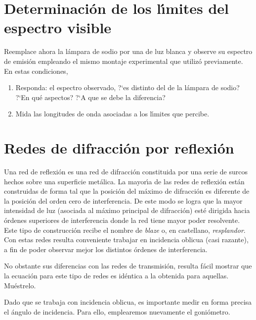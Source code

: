 \documentclass[epj]{svjour}
\begin{document}
\section{Determinaci\'on de los l\'\i mites del espectro visible}

Reemplace ahora la l\'ampara de sodio por una de luz blanca y observe su  
espectro de emisi\'on empleando el mismo montaje experimental que utiliz\'o 
previamente. En estas condiciones, 

\begin{enumerate}
    \item Responda: el espectro observado, ?`es distinto del de la l\'ampara 
        de sodio? ?`En qu\'e aspectos? ?`A que se debe la diferencia? 
    \item Mida las longitudes de onda asociadas a los l\'\i mites que percibe.
\end{enumerate}


\section{Redes de difracci\'on por reflexi\'on}

Una red de reflexi\'on es una red de difracci\'on constituida por una serie
de surcos hechos sobre una superficie met\'alica. La mayor\'\i a de las redes
de reflexi\'on est\'an construidas de forma tal que la posici\'on del m\'aximo
de difracci\'on es diferente de la posici\'on del orden cero de interferencia.
De este modo se logra que la mayor intensidad de luz (asociada al 
m\'aximo principal de difracci\'on) est\'e dirigida hacia \'ordenes superiores
de interferencia donde la red tiene mayor poder resolvente. Este tipo de 
construcci\'on recibe el nombre de {\it blaze} o, en castellano, {\it
resplandor}. Con estas redes resulta conveniente trabajar en incidencia oblicua
(casi razante), a fin de poder observar mejor los distintos \'ordenes de
interferencia. 

No obstante sus diferencias con las redes de transmisi\'on, resulta f\'acil
mostrar que la ecuaci\'on para este tipo de redes es id\'entica a la obtenida
para aquellas. Mu\'estrelo. 

Dado que se trabaja con incidencia oblicua, es importante medir en forma 
precisa el \'angulo de incidencia. Para ello, emplearemos nuevamente el 
goni\'ometro. 
\end{document}
